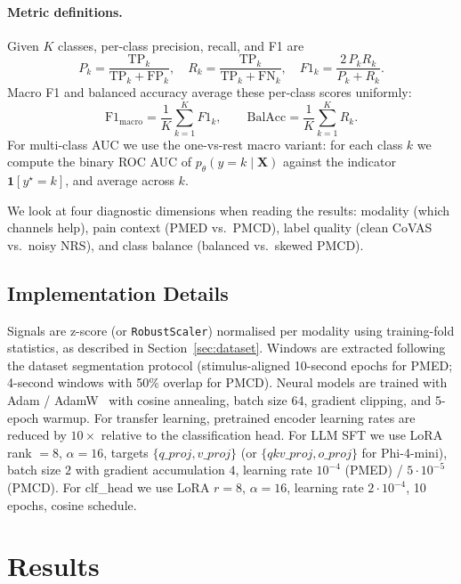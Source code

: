 \documentclass{article}
\begin{document}
\paragraph{Metric definitions.}
Given $K$ classes, per-class precision, recall, and F1 are
\begin{equation}
    P_k = \frac{\mathrm{TP}_k}{\mathrm{TP}_k + \mathrm{FP}_k}, \quad
    R_k = \frac{\mathrm{TP}_k}{\mathrm{TP}_k + \mathrm{FN}_k}, \quad
    F1_k = \frac{2\,P_k R_k}{P_k + R_k}.
\end{equation}
Macro F1 and balanced accuracy average these per-class scores uniformly:
\begin{equation}
    \mathrm{F1}_{\text{macro}} = \frac{1}{K}\sum_{k=1}^{K} F1_k, \qquad
    \mathrm{BalAcc} = \frac{1}{K}\sum_{k=1}^{K} R_k.
\end{equation}
For multi-class AUC we use the one-vs-rest macro variant: for each class $k$ we compute the binary ROC AUC of $p_{\theta}(y=k\mid\mathbf{X})$ against the indicator $\mathbf{1}[y^\star = k]$, and average across $k$.

We look at four diagnostic dimensions when reading the results: modality (which channels help), pain context (PMED vs.\ PMCD), label quality (clean CoVAS vs.\ noisy NRS), and class balance (balanced vs.\ skewed PMCD).

\subsection{Implementation Details}
Signals are z-score (or \texttt{RobustScaler}) normalised per modality using training-fold statistics, as described in Section~\ref{sec:dataset}. Windows are extracted following the dataset segmentation protocol (stimulus-aligned 10-second epochs for PMED; 4-second windows with 50\% overlap for PMCD). Neural models are trained with Adam / AdamW~\citep{kingma2015adam} with cosine annealing, batch size 64, gradient clipping, and 5-epoch warmup. For transfer learning, pretrained encoder learning rates are reduced by $10\times$ relative to the classification head. For LLM SFT we use LoRA rank $= 8$, $\alpha = 16$, targets $\{q\_proj, v\_proj\}$ (or $\{qkv\_proj, o\_proj\}$ for Phi-4-mini), batch size $2$ with gradient accumulation $4$, learning rate $10^{-4}$ (PMED) / $5\cdot 10^{-5}$ (PMCD). For clf\_head we use LoRA $r=8$, $\alpha=16$, learning rate $2\cdot10^{-4}$, 10 epochs, cosine schedule.

\section{Results}
\label{sec:results}
\end{document}
